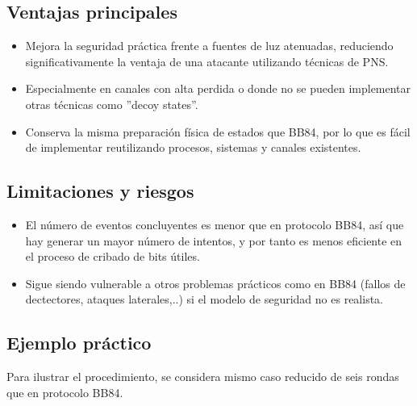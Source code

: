 \subsection{Ventajas principales}
\begin{itemize}
    \item Mejora la seguridad práctica frente a fuentes de luz atenuadas, reduciendo significativamente la ventaja de una atacante utilizando técnicas de PNS.
    \item Especialmente en canales con alta perdida o donde no se pueden implementar otras técnicas como ''decoy states''.
    \item Conserva la misma preparación física de estados que BB84, por lo que es fácil de implementar reutilizando procesos, sistemas y canales existentes.
\end{itemize}

\subsection{Limitaciones y riesgos}
\begin{itemize}
    \item El número de eventos concluyentes es menor que en protocolo BB84, así que hay generar un mayor número de intentos, y por tanto es menos eficiente en el proceso de cribado de bits útiles.
    \item Sigue siendo vulnerable a otros problemas prácticos como en BB84 (fallos de dectectores, ataques laterales,..) si el modelo de seguridad no es realista.

\end{itemize}

\subsection{Ejemplo práctico}

Para ilustrar el procedimiento, se considera mismo caso reducido de seis rondas que en protocolo BB84.

